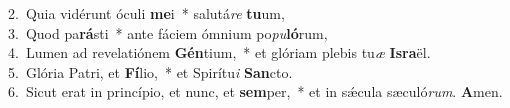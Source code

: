 {2.~}Quia vidérunt óculi \textbf{me}i~* salutá\textit{re} \textbf{tu}um,\\
{3.~}Quod pa\textbf{rá}sti~* ante fáciem ómnium po\textit{pu}\textbf{ló}rum,\\
{4.~}Lumen ad revelatiónem \textbf{Gén}tium,~* et glóriam plebis tu\textit{æ} \textbf{Is}\textbf{ra}ël.\\
{5.~}Glória Patri, et \textbf{Fí}lio,~* et Spirítu\textit{i} \textbf{San}cto.\\
{6.~}Sicut erat in princípio, et nunc, et \textbf{sem}per,~* et in sǽcula sæculó\textit{rum}. \textbf{A}men.\\
